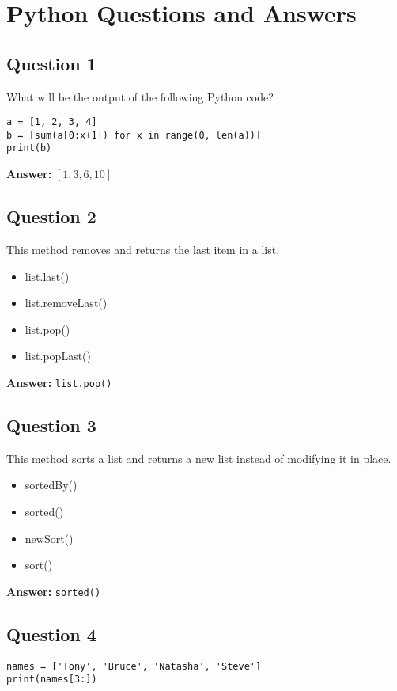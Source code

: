 \documentclass{article}
\begin{document}
\section*{Python Questions and Answers}

\subsection*{Question 1}
What will be the output of the following Python code?
\begin{verbatim}
a = [1, 2, 3, 4]
b = [sum(a[0:x+1]) for x in range(0, len(a))]
print(b)
\end{verbatim}

\textbf{Answer:} \([1, 3, 6, 10]\)

\subsection*{Question 2}
This method removes and returns the last item in a list.
\begin{itemize}
    \item list.last()
    \item list.removeLast()
    \item list.pop()
    \item list.popLast()
\end{itemize}

\textbf{Answer:} \texttt{list.pop()}

\subsection*{Question 3}
This method sorts a list and returns a new list instead of modifying it in place.
\begin{itemize}
    \item sortedBy()
    \item sorted()
    \item newSort()
    \item sort()
\end{itemize}

\textbf{Answer:} \texttt{sorted()}

\subsection*{Question 4}
\begin{verbatim}
names = ['Tony', 'Bruce', 'Natasha', 'Steve']
print(names[3:])
\end{verbatim}
\end{document}
